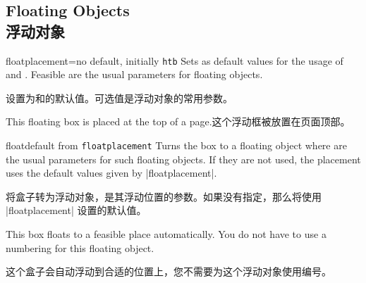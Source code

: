 \setcounter{section}{4}
\setcounter{subsection}{12}
\setcounter{subsubsection}{0}

\subsection{Floating Objects\\浮动对象}
\begin{docTcbKey}{floatplacement}{=}{no default, initially \texttt{htb}}
Sets  as default values for the usage of 
and .
Feasible are the usual parameters for floating objects.

设置为和的默认值。可选值是浮动对象的常用参数。
\begin{dispListing}

\begin{tcolorbox}[floatplacement=t,%
float,%
title=Floating box from |floatplacement|,%
watermark text={I am floating}]%
This floating box is placed at the top of a page.这个浮动框被放置在页面顶部。
\end{tcolorbox}
\end{dispListing}
\end{docTcbKey}
{\tcbusetemp}


\begin{docTcbKey}{float}{}{default from \texttt{floatplacement}}
Turns the box to a floating object where  are the
usual parameters for such floating objects.
If they are not used, the placement uses the default values given by
|floatplacement|.

将盒子转为浮动对象，是其浮动位置的参数。如果没有指定，那么将使用 |floatplacement| 设置的默认值。
\begin{dispListing}
\begin{tcolorbox}[float, title=Floating box from |float|,
enhanced,watermark text={I'm also floating}]
This box floats to a feasible place automatically. You do not have to
use a numbering for this floating object.

这个盒子会自动浮动到合适的位置上，您不需要为这个浮动对象使用编号。
\end{tcolorbox}
\end{dispListing}
\end{docTcbKey}
{\tcbusetemp}


